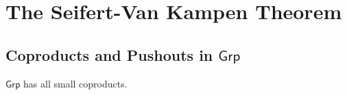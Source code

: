 \section*{The Seifert-Van Kampen Theorem}
\subsection*{Coproducts and Pushouts in $\mathsf{Grp}$}

\begin{proposition}
	$\mathsf{Grp}$ has all small coproducts.
	\label{prop:coproducts_grp}
\end{proposition}

